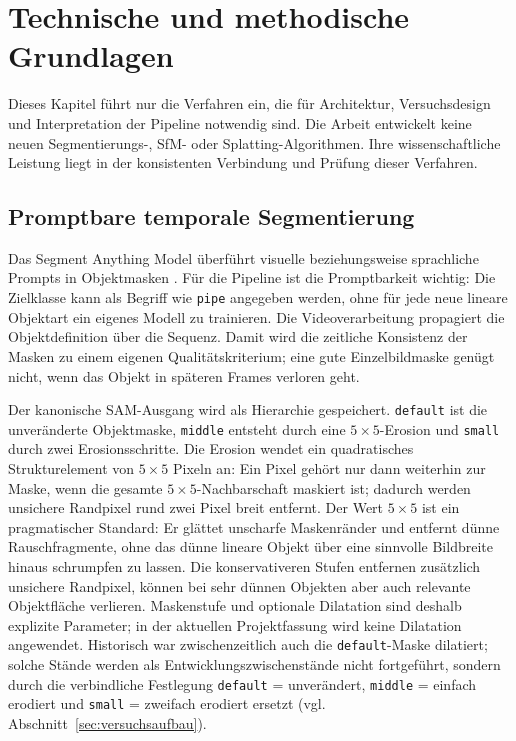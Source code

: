 \section{Technische und methodische Grundlagen}
\label{sec:grundlagen}

Dieses Kapitel führt nur die Verfahren ein, die für Architektur,
Versuchsdesign und Interpretation der Pipeline notwendig sind. Die Arbeit
entwickelt keine neuen Segmentierungs-, SfM- oder Splatting-Algorithmen. Ihre
wissenschaftliche Leistung liegt in der konsistenten Verbindung und Prüfung
dieser Verfahren.

\subsection{Promptbare temporale Segmentierung}

Das Segment Anything Model überführt visuelle beziehungsweise sprachliche
Prompts in Objektmasken \parencite{kirillov2023segment,metaSam3}. Für die
Pipeline ist die Promptbarkeit wichtig: Die Zielklasse kann als Begriff wie
\texttt{pipe} angegeben werden, ohne für jede neue lineare Objektart ein
eigenes Modell zu trainieren. Die Videoverarbeitung propagiert die
Objektdefinition über die Sequenz. Damit wird die zeitliche Konsistenz der
Masken zu einem eigenen Qualitätskriterium; eine gute Einzelbildmaske genügt
nicht, wenn das Objekt in späteren Frames verloren geht.

Der kanonische SAM-Ausgang wird als Hierarchie gespeichert. \texttt{default}
ist die unveränderte Objektmaske, \texttt{middle} entsteht durch eine
$5\times5$-Erosion und \texttt{small} durch zwei Erosionsschritte. Die
Erosion wendet ein quadratisches Strukturelement von $5\times5$ Pixeln an:
Ein Pixel gehört nur dann weiterhin zur Maske, wenn die gesamte
$5\times5$-Nachbarschaft maskiert ist; dadurch werden unsichere Randpixel
rund zwei Pixel breit entfernt. Der Wert $5\times5$ ist ein pragmatischer
Standard: Er glättet unscharfe Maskenränder und entfernt dünne
Rauschfragmente, ohne das dünne lineare Objekt über eine sinnvolle Bildbreite
hinaus schrumpfen zu lassen. Die konservativeren Stufen entfernen zusätzlich
unsichere Randpixel, können bei sehr dünnen Objekten aber auch relevante
Objektfläche verlieren. Maskenstufe und optionale Dilatation sind deshalb
explizite Parameter; in der aktuellen Projektfassung wird keine Dilatation
angewendet. Historisch war zwischenzeitlich auch die \texttt{default}-Maske
dilatiert; solche Stände werden als Entwicklungszwischenstände nicht
fortgeführt, sondern durch die verbindliche Festlegung
\texttt{default} = unverändert, \texttt{middle} = einfach erodiert und
\texttt{small} = zweifach erodiert ersetzt (vgl. Abschnitt~\ref{sec:versuchsaufbau}).

